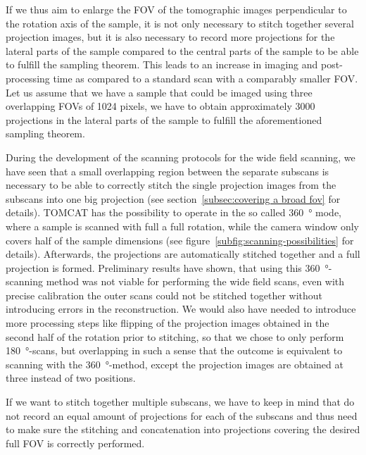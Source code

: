 If we thus aim to enlarge the FOV of the tomographic images perpendicular to the rotation axis of the sample, it is not only necessary to stitch together several projection images, but it is also necessary to record more projections for the lateral parts of the sample compared to the central parts of the sample to be able to fulfill the sampling theorem. This leads to an increase in imaging and post-processing time as compared to a standard scan with a comparably smaller FOV. Let us assume that we have a sample that could be imaged using three overlapping FOVs of 1024 pixels, we have to obtain approximately 3000 projections in the lateral parts of the sample to fulfill the aforementioned sampling theorem.

During the development of the scanning protocols for the wide field scanning, we have seen that a small overlapping region between the separate subscans is necessary to be able to correctly stitch the single projection images from the subscans into one big projection (see section~\ref{subsec:covering a broad fov} for details). TOMCAT has the possibility to operate in the so called \SI{360}{\degree} mode, where a sample is scanned with full a full rotation, while the camera window only covers half of the sample dimensions (see figure~\ref{subfig:scanning-possibilities} for details). Afterwards, the projections are automatically stitched together and a full projection is formed. Preliminary results have shown, that using this \SI{360}{\degree}-scanning method was not viable for performing the wide field scans, even with precise calibration the outer scans could not be stitched together without introducing errors in the reconstruction. We would also have needed to introduce more processing steps like flipping of the projection images obtained in the second half of the rotation prior to stitching, so that we chose to only perform \SI{180}{\degree}-scans, but overlapping in such a sense that the outcome is equivalent to scanning with the \SI{360}{\degree}-method, except the projection images are obtained at three instead of two positions.

If we want to stitch together multiple subscans,  we have to keep in mind that do not record an equal amount of projections for each of the subscans and thus need to make sure the stitching and concatenation into projections covering the desired full FOV is correctly performed.

